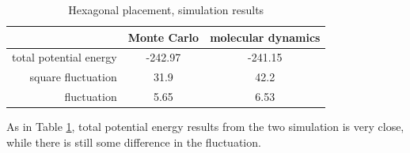 \documentclass[UTF8,a4paper,no-math]{article}
\begin{document}
\begin{table}[H]
	\centering
	\caption{Hexagonal placement, simulation results}
	\begin{tabular}{rcc}
		\toprule
		\toprule
		                       & Monte Carlo & molecular dynamics \\ \midrule
		total potential energy & -242.97     & -241.15            \\
		square fluctuation     & 31.9        & 42.2               \\
		fluctuation            & 5.65        & 6.53               \\
		\bottomrule
	\end{tabular}%
	\label{tab:rand2}%
\end{table}%
As in Table \ref{tab:rand2}, total potential energy results from the two simulation is very close, while there is still some difference 
in the fluctuation.
\end{document}
